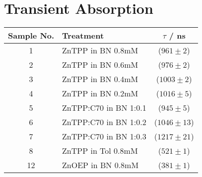 \section{Transient Absorption}
\label{sec:TRAS}

\begin{table}[ht]
    \centering
    \begin{tabular}{clc}
        \toprule
        Sample No. &    Treatment &    $\tau$ / \si{\nano\second} \\
        \midrule
            1 &     ZnTPP in BN 0.8mM &     ($961 \pm 2 $) \\
            2 &     ZnTPP in BN 0.6mM &  ($976 \pm 2$) \\
            3 &     ZnTPP in BN 0.4mM & ($1003 \pm 2$) \\
            4 &     ZnTPP in BN 0.2mM & ($1016 \pm 5$) \\
            5 & ZnTPP:C70 in BN 1:0.1 &  ($945 \pm 5$) \\
            6 & ZnTPP:C70 in BN 1:0.2 & ($1046 \pm 13$) \\
            7 & ZnTPP:C70 in BN 1:0.3 & ($1217 \pm 21$) \\
            8 &    ZnTPP in Tol 0.8mM &  ($521 \pm 1$) \\
            12 &     ZnOEP in BN 0.8mM &  ($381 \pm 1$) \\
        \bottomrule
    \end{tabular}
\end{table}


